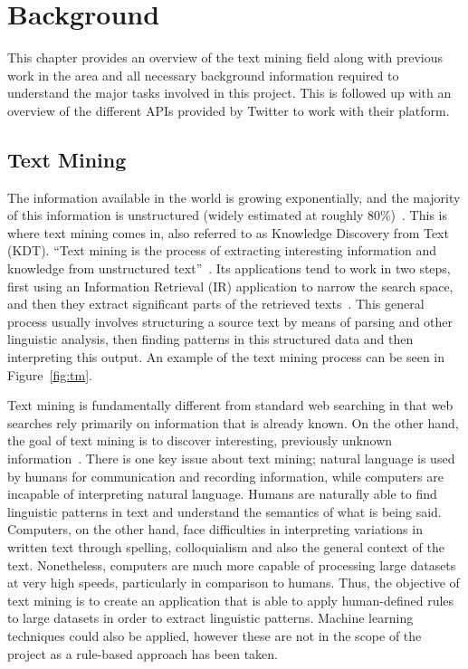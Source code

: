 \chapter{Background}
\label{cha:background}
This chapter provides an overview of the text mining field along with previous work in the area and all necessary background information required to understand the major tasks involved in this project. This is followed up with an overview of the different APIs provided by Twitter to work with their platform.

\section{Text Mining}
\label{sec:textmining}
The information available in the world is growing exponentially, and the majority of this information is unstructured (widely estimated at roughly 80\%)~\cite{Grimes08}. This is where text mining comes in, also referred to as Knowledge Discovery from Text (KDT).
``Text mining is the process of extracting interesting information and knowledge from unstructured text''~\cite{hotho-etal-ldv-2005}. Its applications tend to work in two steps, first using an Information Retrieval (IR) application to narrow the search space, and then they extract significant parts of the retrieved texts~\cite{Polajnar2006}. This general process usually involves structuring a source text by means of parsing and other linguistic analysis, then finding patterns in this structured data and then interpreting this output. An example of the text mining process can be seen in Figure~\ref{fig:tm}.

Text mining is fundamentally different from standard web searching in that web searches rely primarily on information that is already known. On the other hand, the goal of text mining is to discover interesting, previously unknown information~\cite{Gupta_Lehal_2009}.
There is one key issue about text mining; natural language is used by humans for communication and recording information, while computers are incapable of interpreting natural language. Humans are naturally able to find linguistic patterns in text and understand the semantics of what is being said. Computers, on the other hand, face difficulties in interpreting variations in written text through spelling, colloquialism and also the general context of the text. Nonetheless, computers are much more capable of processing large datasets at very high speeds, particularly in comparison to humans. 
Thus, the objective of text mining is to create an application that is able to apply human-defined rules to large datasets  in order to extract linguistic patterns. Machine learning techniques could also be applied, however these are not in the scope of the project as a rule-based approach has been taken.

